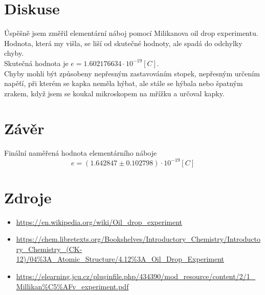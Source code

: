 \documentclass{article}
\begin{document}
\section{Diskuse}
Úspěšně jsem změřil elementární náboj pomocí Milikanova oil drop experimentu.
Hodnota, která my višla, se liší od skutečné hodnoty, ale spadá do odchylky chyby.\\
Skutečná hodnota je $e = 1.602 176 634 \cdot 10^{-19} [C]$.\\
Chyby mohli být způsobeny nepřesným zastavováním stopek,
nepřesným určením napěťí, při kterém se kapka neměla hýbat, ale stále se hýbala nebo
špatným zrakem, když jsem se koukal mikroskopem na mřížku a určoval kapky.
\section{Závěr}
Finální naměřená hodnota elementárního náboje\\
$$e = (1.642 847 \pm 0.102798) \cdot 10^{-19} [C]$$
\section{Zdroje}
\begin{itemize}
  \item\url{https://en.wikipedia.org/wiki/Oil_drop_experiment}
  \item\url{https://chem.libretexts.org/Bookshelves/Introductory_Chemistry/Introductory_Chemistry_(CK-12)/04%3A_Atomic_Structure/4.12%3A_Oil_Drop_Experiment}
  \item\url{https://elearning.jcu.cz/pluginfile.php/434390/mod_resource/content/2/1_Millikan%C5%AFv_experiment.pdf}
\end{itemize}
\end{document}
